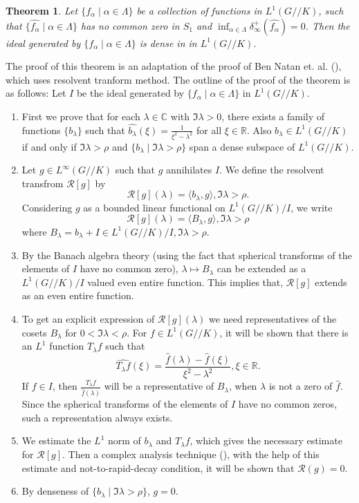 \documentclass[11pt,reqno]{amsart}
\newcommand{\what}{\widehat}%
\newcommand{\R}{\mathbb R}%
\newcommand{\C}{\mathbb C}%
\newtheorem{theorem}{Theorem}[section]
\theoremstyle{definition}
\theoremstyle{definition}
\numberwithin{equation}{section}
\begin{document}
\begin{theorem}\label{main-theorem}
Let $\{f_\alpha\mid \alpha\in \Lambda\}$ be a collection of functions in $L^1(G//K)$, such that $\{\what{f_\alpha}\mid\alpha\in \Lambda\}$ has no common zero in $S_1$ and $\inf_{\alpha\in\Lambda}\delta_\infty^+(\what{f_\alpha})=0$. Then the ideal generated by $\{f_\alpha\mid \alpha\in \Lambda\}$  is dense in in $L^1(G//K)$.
\end{theorem}
The proof of this theorem is an adaptation of the proof of Ben Natan et. al. (\cite{Ben-2}), which uses resolvent tranform method.
The outline of the proof of the theorem is as follows:
Let $I$ be the ideal generated by $\{f_\alpha\mid \alpha\in \Lambda\}$ in $L^1(G//K)$.
\begin{enumerate}
\item First we prove that for each $\lambda\in\C$ with $\Im\lambda>0$, there exists a family of functions $\{b_\lambda\}$ such that $\widehat{b_\lambda}(\xi)=\frac{1}{\xi^2-\lambda^2}$ for all $\xi\in \mathbb{R}$. Also $b_\lambda\in L^1(G//K)$ if and only if $\Im\lambda>\rho$ and $\{b_\lambda\mid \Im\lambda>\rho\}$ span a dense subspace of $L^1(G//K)$.

\item Let $g\in L^\infty(G//K)$ such that $g$ annihilates $I$. We define the resolvent transfrom $\mathcal R[g]$ by $$\mathcal R[g](\lambda)=\langle b_\lambda, g\rangle, \Im\lambda>\rho.$$ Considering $g$ as a bounded linear functional on $L^1(G//K)/I$, we write $$\mathcal R[g](\lambda)=\langle B_\lambda, g\rangle, \Im\lambda>\rho$$ where $B_\lambda=b_\lambda + I\in L^1(G//K)/I, \Im\lambda>\rho$.
\item By the Banach algebra theory (using the fact that spherical transforms of the  elements of $I$ have no common zero), $\lambda\mapsto B_\lambda$ can be extended as a $L^1(G//K)/I$ valued even entire function. This implies that, $\mathcal R[g]$ extends as an even entire function.
\item To get an explicit expression of $\mathcal R[g](\lambda)$ we need  representatives of the cosets $B_\lambda$  for $0<\Im \lambda<\rho$. For $f\in L^1(G//K)$, it will be shown that there is an $L^1$ function $T_\lambda f$ such that $$\what{T_\lambda f}(\xi)=\frac{\what{f}(\lambda)-\what{f}(\xi)}{\xi^2-\lambda^2}, \xi\in\R.$$ If $f\in I$, then $\frac{T_\lambda f}{\what{f}(\lambda)}$ will be a representative of $B_\lambda$, when $\lambda$ is not a zero of $\what{f}$. Since the spherical transforms of the elements of $I$ have no common zeros,  such a representation always exists.


\item We estimate the $L^1$ norm of $b_\lambda$ and $T_\lambda f$, which gives the necessary estimate for $\mathcal R[g]$.  Then a complex analysis technique (\cite{Hedenmalm-1985, Dah}), with the help of this estimate and not-to-rapid-decay condition, it will be shown that $\mathcal R(g)=0$.

\item By denseness of $\{b_\lambda\mid \Im\lambda>\rho\}$,  $g=0$.
\end{enumerate}
 
\end{document}
